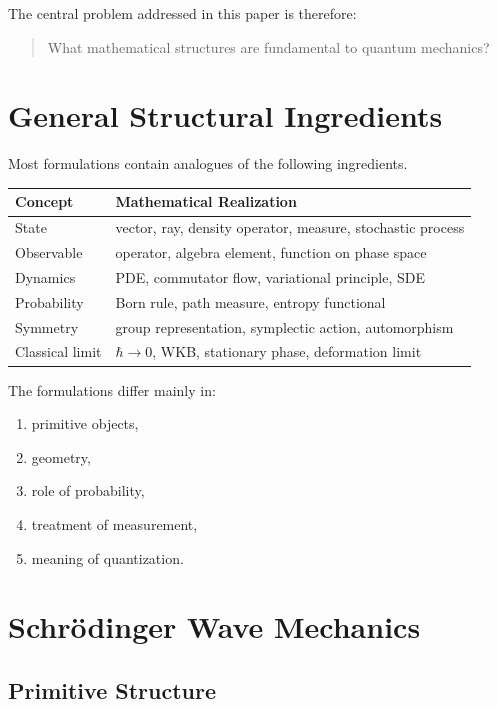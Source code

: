 \documentclass[11pt]{article}
\begin{document}
The central problem addressed in this paper is therefore:

\begin{quote}
What mathematical structures are fundamental to quantum mechanics?
\end{quote}

\section{General Structural Ingredients}

Most formulations contain analogues of the following ingredients.

\begin{longtable}{p{4cm}p{9cm}}
\toprule
Concept & Mathematical Realization \\
\midrule
State & vector, ray, density operator, measure, stochastic process \\
Observable & operator, algebra element, function on phase space \\
Dynamics & PDE, commutator flow, variational principle, SDE \\
Probability & Born rule, path measure, entropy functional \\
Symmetry & group representation, symplectic action, automorphism \\
Classical limit & $\hbar\to0$, WKB, stationary phase, deformation limit \\
\bottomrule
\end{longtable}

The formulations differ mainly in:

\begin{enumerate}
\item primitive objects,
\item geometry,
\item role of probability,
\item treatment of measurement,
\item meaning of quantization.
\end{enumerate}

\section{Schr\"odinger Wave Mechanics}

\subsection{Primitive Structure}
\end{document}
